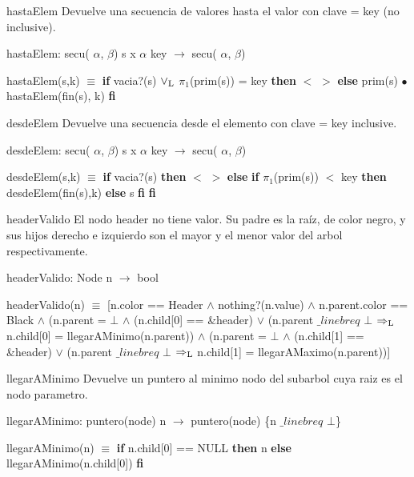 \begin{DoxyParagraph}{hasta\-Elem}
\-Devuelve una secuencia de valores hasta el valor con clave = key (no inclusive).
\end{DoxyParagraph}
hasta\-Elem\-: secu( $\alpha$, $\beta$) s x $\alpha$ key $\to$ secu( $\alpha$, $\beta$)\par
 hasta\-Elem(s,k) $\equiv$ {\bfseries if} vacia?(s) $\lor_{\rm L}$ $\pi_1$(prim(s)) = key {\bfseries then} $<$ $>$ {\bfseries else} prim(s) $\bullet$ hasta\-Elem(fin(s), k) {\bfseries fi} 

\begin{DoxyParagraph}{desde\-Elem}
\-Devuelve una secuencia desde el elemento con clave = key inclusive.
\end{DoxyParagraph}
desde\-Elem\-: secu( $\alpha$, $\beta$) s x $\alpha$ key $\to$ secu( $\alpha$, $\beta$)\par
 desde\-Elem(s,k) $\equiv$ {\bfseries if} vacia?(s) {\bfseries then} $<$ $>$ {\bfseries else} {\bfseries if} $\pi_1$(prim(s)) $<$ key {\bfseries then} desde\-Elem(fin(s),k) {\bfseries else} s {\bfseries fi} {\bfseries fi} 

\begin{DoxyParagraph}{header\-Valido}
\-El nodo header no tiene valor. \-Su padre es la raíz, de color negro, y sus hijos derecho e izquierdo son el mayor y el menor valor del arbol respectivamente.
\end{DoxyParagraph}
header\-Valido\-: \-Node n $\to$ bool\par
 header\-Valido(n) $\equiv$ \mbox{[}n.\-color == \-Header $\land$ nothing?(n.\-value) $\land$ n.\-parent.\-color == \-Black $\land$ (n.\-parent = $\bot$ $\land$ (n.\-child\mbox{[}0\mbox{]} == \&header) $\lor$ (n.\-parent $\_linebr eq$ $\bot$ $\Rightarrow_{\rm L}$ n.\-child\mbox{[}0\mbox{]} = llegar\-A\-Minimo(n.\-parent)) $\land$ (n.\-parent = $\bot$ $\land$ (n.\-child\mbox{[}1\mbox{]} == \&header) $\lor$ (n.\-parent $\_linebr eq$ $\bot$ $\Rightarrow_{\rm L}$ n.\-child\mbox{[}1\mbox{]} = llegar\-A\-Maximo(n.\-parent))\mbox{]} 

\begin{DoxyParagraph}{llegar\-A\-Minimo}
\-Devuelve un puntero al minimo nodo del subarbol cuya raiz es el nodo parametro.
\end{DoxyParagraph}
llegar\-A\-Minimo\-: puntero(node) n $\to$ puntero(node) \{n $\_linebr eq$ $\bot$\}\par
 llegar\-A\-Minimo(n) $\equiv$ {\bfseries if} n.\-child\mbox{[}0\mbox{]} == \-N\-U\-L\-L {\bfseries then} n {\bfseries else} llegar\-A\-Minimo(n.\-child\mbox{[}0\mbox{]}) {\bfseries fi} 

